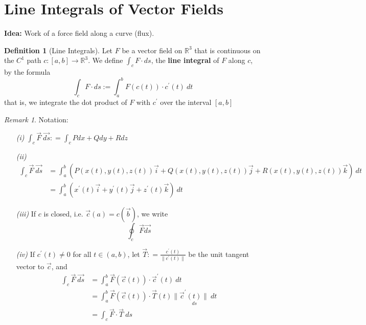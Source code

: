 \documentclass[12pt]{book}
\theoremstyle{definition}
\newtheorem{definition}{Definition}[section]
\theoremstyle{remark}
\newtheorem*{remark}{Remark}
\begin{document}
  \section{Line Integrals of Vector Fields}    \label{sub:Line Integrals of Vector Fields}
  \textbf{Idea:} Work of a force field along a curve (flux).
  \begin{definition}[Line Integrals] Let $F$ be a vector field on $\mathbb{R}^3$ that is continuous on the $C^1$ path $c: [a, b] \to \mathbb{R}^3$. We define $\int_c F \cdot ds$, the \textbf{line integral} of $F$ along $c$, by
    the formula $$\int_c F \cdot ds := \int_{{a}}^{{b}} {F(c(t)) \cdot c^\prime (t)} \: d{t} {  }
$$
    that is, we integrate the dot product of $F$ with $c^\prime$ over the interval $[a,b]$
  \end{definition}
  \begin{remark} 
    Notation: 
    \begin{enumerate}
      \item[\it (i)] $\int_{{c}}^{{}} {\vec{{F}} } \: \vec{d{s}} : = \int_{{c}}^{{}} {P dx + Q dy + Rdz} \: {}$ 
      \item[\it (ii)]  
      \begin{equation*}
        \begin{split}
          \int_{{c}}^{{}} {\vec{{F}} } \: \vec{d{s}} &= \int_{{a}}^{{b}} (P(x(t), y(t), z(t))\vec{{i}} + Q(x(t), y(t), z(t))\vec{{j}} + R(x(t), y(t), z(t))\vec{{k}} {}) \: d{t} \\ 
          &= \int_{{a}}^{{b}} (x^\prime(t) \vec{{i}}+ y^\prime (t) \vec{{j}} + z^\prime (t) \vec{{k}} ) \: d{t} {}
        \end{split}
      \end{equation*}
      \item[\it (iii)] If $c$ is closed, i.e. $\vec{{c}} {(a)} = c(\vec{{b}})$, we write $$\oint_c \vec{{F}} \vec{{ds}} {} $$ 
      \item[\it (iv)] If $c^ \prime(t) \neq 0$ for all $t \in(a,b)$, let $\vec{{T}} : = \frac{c^\prime(t)}{\| c^\prime (t)\|}$ be the unit tangent vector to $\vec{{c}} $, and 
      \begin{equation*}
        \begin{split}
          \int_{{c}}^{{}} {\vec{{F}} } \: \vec{d{s}} &= \int_{{a}}^{{b}} {\vec{{F}} (\vec{{c}} (t))} \cdot \vec{{c}}^\prime (t)\: d{t} {}\\ 
          & = \int_{{a}}^{{b}} {\vec{{F}} (\vec{{c}} (t)) \cdot \vec{{T}} (t)\underset{ds}{ \|\vec{{c}}^ \prime(t)\| \: d{t}}} {}\\ 
          &= \int_{{c}}^{{}} {\vec{{F}} \cdot \vec{{T}} } \: d{s} {}
        \end{split}
      \end{equation*}
    \end{enumerate}
  \end{remark} 
\end{document}
